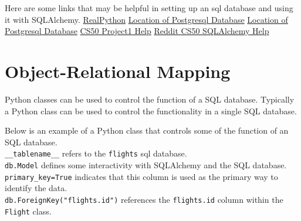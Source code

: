 \documentclass[]{book}
\begin{document}
Here are some links that may be helpful in setting up an sql database and using it with SQLAlchemy.
\href{'https://realpython.com/flask-by-example-part-2-postgres-sqlalchemy-and-alembic/'}{RealPython}
\href{'https://stackoverflow.com/questions/1137060/where-does-postgresql-store-the-database'}{Location of Postgresql Database}
\href{'https://stackoverflow.com/questions/26332319/finding-local-postgresql-database-url/51955545'}{Location of Postgresql Database}
\href{'https://docs.cs50.net/web/2018/x/projects/1/project1.html'}{CS50 Project1 Help}
\href{'https://www.reddit.com/r/cs50/comments/bxjafn/sqlalchemy_error_cs50w_lecture_3/'}{Reddit CS50 SQLAlchemy Help}

\hypertarget{object-relational-mapping}{%
\section{Object-Relational Mapping}\label{object-relational-mapping}}

Python classes can be used to control the function of a SQL database. Typically a Python class can be used to control the functionality in a single SQL database.

Below is an example of a Python class that controls some of the function of an SQL database.\\
\texttt{\_\_tablename\_\_} refers to the \texttt{flights} sql database.\\
\texttt{db.Model} defines some interactivity with SQLAlchemy and the SQL database.\\
\texttt{primary\_key=True} indicates that this column is used as the primary way to identify the data.\\
\texttt{db.ForeignKey("flights.id")} references the \texttt{flights.id} column within the \texttt{Flight} class.
\end{document}
